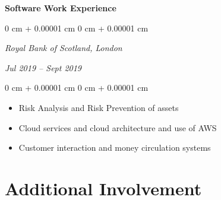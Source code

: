 \documentclass[10pt, letterpaper]{article}
\newenvironment{onecolentry}{
    \begin{adjustwidth}{
        0 cm + 0.00001 cm
    }{
        0 cm + 0.00001 cm
    }
}{
    \end{adjustwidth}
} %
\newenvironment{twocolentry}[2][]{
    \onecolentry
    \def\secondColumn{#2}
    \setcolumnwidth{\fill, 4.5 cm}
    \begin{paracol}{2}
}{
    \switchcolumn \raggedleft \secondColumn
    \end{paracol}
    \endonecolentry
} %
\begin{document}
        \vspace{0.10cm}
        
         \textbf{Software Work Experience}


        \vspace{0.05 cm}

         \begin{twocolentry}{
            
            
        \textit{Jul 2019 – Sept 2019}}

            \textit{Royal Bank of Scotland, London}
        \end{twocolentry}

        \vspace{0.10 cm}
        \begin{onecolentry}
            \begin{itemize}
                \item Risk Analysis and Risk Prevention of assets
                \item Cloud services and cloud architecture and use of AWS
                \item Customer interaction and money circulation systems
            \end{itemize}
               
        \end{onecolentry}


        \vspace{0.2 cm}



    
     \section{Additional Involvement}
\end{document}
